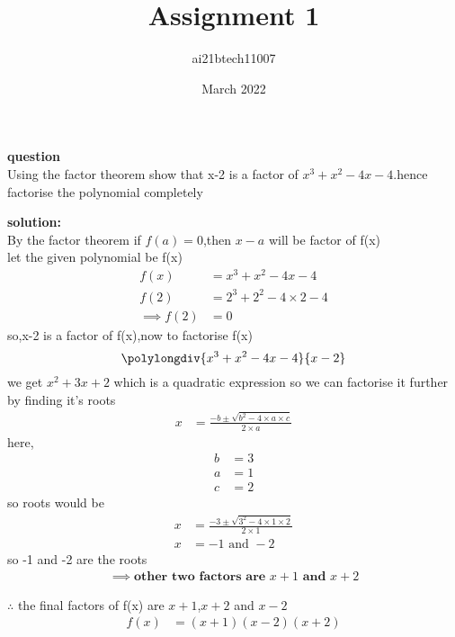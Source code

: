 \documentclass[12pt,two column]{article}
\title{Assignment 1}
\author{ai21btech11007 }
\date{March 2022}
\begin{document}
\maketitle

\textbf{question}\\
Using the factor theorem show that x-2 is a factor of $x^3+x^2-4x-4$.hence factorise the polynomial completely

\textbf{solution: }\\
By the factor theorem if $f(a)=0$,then $x-a$ will be factor of f(x)
\\let the given polynomial be f(x)
\begin{align}
  f(x) &= x^3+x^2-4x-4\\  
  f(2) &= 2^3+2^2-4\times2-4\\
\implies
f(2) &= 0
\end{align}
   so,x-2 is a factor of f(x),now to factorise f(x) 
\[
 \polylongdiv{x^3+x^2-4x-4}{x-2}
 \]
  we get $x^2+3x+2$
  which is a quadratic expression so we can factorise it further by finding it's roots
 \begin{align}
     x &= \frac{-b \pm \sqrt{b^2-4\times a\times c}}{2\times a}
 \end{align}
 here,
 \begin{align}
  b &=3\\
  a &=1\\
  c &=2
 \end{align}
 so roots would be
 \begin{align}
   x &= \frac{-3 \pm \sqrt{3^2-4\times 1\times 2}}{2\times 1} \\
   x &=  -1\text{ and }-2
 \end{align}
 so -1 and -2 are the roots
\begin{align}
\implies
\textbf{other two factors are $x+1$ and $x+2$}
\end{align}

$\therefore$ the final factors of f(x) are $x+1$,$x+2$ and $x-2$
\begin{align}
f(x)&=( x+1)( x-2)( x+2)
\end{align}
\end{document}
